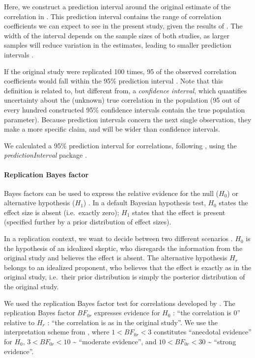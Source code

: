 \documentclass[11pt,]{memoir}
\let\oldparagraph\paragraph
\renewcommand{\paragraph}[1]{\oldparagraph{#1}\mbox{}}
\begin{document}
Here, we construct a prediction interval around the original estimate of the correlation in \textcite{London2015}. This prediction interval contains the range of correlation coefficients we can expect to see in the present study, given the results of \textcite{London2015}. The width of the interval depends on the sample sizes of both studies, as larger samples will reduce variation in the estimates, leading to smaller prediction intervals \autocite{Patil2016}.

If the original study were replicated 100 times, 95 of the observed correlation coefficients would fall within the 95\% prediction interval \autocite{Patil2016}. Note that this definition is related to, but different from, a \emph{confidence interval}, which quantifies uncertainty about the (unknown) true correlation in the population (95 out of every hundred constructed 95\% confidence intervals contain the true population parameter). Because prediction intervals concern the next single observation, they make a more specific claim, and will be wider than confidence intervals.

We calculated a 95\% prediction interval for correlations, following \textcite{Spence2016}, using the \emph{predictionInterval} package \autocite[Version 1.0.0;][]{R-predictionInterval}.

\hypertarget{repBF}{%
\paragraph{Replication Bayes factor}\label{repBF}}

Bayes factors can be used to express the relative evidence for the null (\(H_0\)) or alternative hypothesis (\(H_1\)) \autocite{Wagenmakers2018a}. In a default Bayesian hypothesis test, \(H_0\) states the effect size is absent (i.e.~exactly zero); \(H_1\) states that the effect is present (specified further by a prior distribution of effect sizes).

In a replication context, we want to decide between two different scenarios \autocite{Verhagen2014}. \(H_0\) is the hypothesis of an idealized skeptic, who disregards the information from the original study and believes the effect is absent. The alternative hypothesis \(H_r\) belongs to an idealized proponent, who believes that the effect is exactly as in the original study, i.e.~their prior distribution is simply the posterior distribution of the original study.

We used the replication Bayes factor test for correlations developed by \textcite{Wagenmakers2016}. The replication Bayes factor \(BF_{0r}\) expresses evidence for \(H_0\) : ``the correlation is 0'' relative to \(H_r\) : ``the correlation is as in the original study''. We use the interpretation scheme from \textcite{Wagenmakers2018}, where \(1 < BF_{0r} < 3\) constitutes ``anecdotal evidence'' for \(H_0\), \(3 < BF_{0r} < 10\) \textasciitilde{} ``moderate evidence'', and \(10 < BF_{0r} < 30\) \textasciitilde{} ``strong evidence''.
\end{document}
